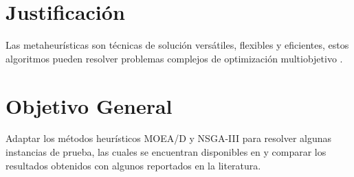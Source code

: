 \documentclass[letterpaper,10pt]{article}
\begin{document}
\section{Justificación}

%
Las metaheurísticas son técnicas de solución versátiles, flexibles y eficientes, estos algoritmos pueden resolver problemas complejos de optimización multiobjetivo \cite{coello1999comprehensive} .
\newline
%
%      

\section{Objetivo General}

Adaptar los métodos heurísticos MOEA/D y NSGA-III para resolver algunas instancias de prueba, las cuales se encuentran disponibles en \cite{zhang2008multiobjective} y comparar los resultados obtenidos con algunos reportados en la literatura.
\end{document}
